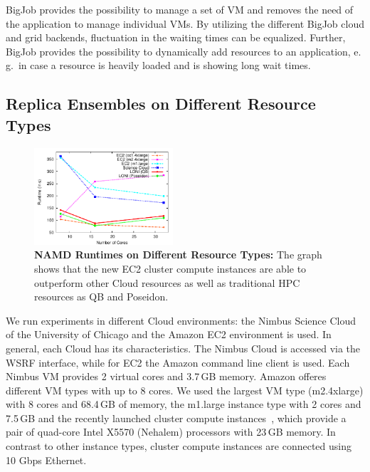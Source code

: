 \documentclass[conference,final]{IEEEtran}
\begin{document}
BigJob provides the possibility to manage a set of VM and removes the
need of the application to manage individual VMs. By utilizing
the different BigJob cloud and grid backends, fluctuation in the waiting 
times can be equalized. Further, BigJob provides the possibility
to dynamically add resources to an application, e.\,g.\ in case a
resource is heavily loaded and is showing long wait times.



\subsection{Replica Ensembles on Different Resource Types}
\label{sec:performance_namd}
\begin{figure}[htbp]
    \centering
        \includegraphics[width=0.46\textwidth]{performance/namd_run}
    \caption{\textbf{NAMD Runtimes on Different Resource Types: } The
          graph shows that the new EC2 cluster compute instances are 
          able to outperform other Cloud resources as well as traditional
          HPC resources as QB and Poseidon.}
    \label{fig:performance_namd_run}
\end{figure}

We run experiments in different Cloud environments: the Nimbus Science 
Cloud of the University of Chicago and the Amazon EC2 environment is used. In general, each Cloud has 
its characteristics. The Nimbus Cloud is accessed via the WSRF
interface, while for EC2 the Amazon command line client is used. 
Each Nimbus VM provides 2 virtual cores and 3.7\,GB memory. 
Amazon offeres different VM types with up to 8 cores. We used the largest 
VM type (m2.4xlarge) with 8 cores and 68.4\,GB of memory,
the m1.large instance type with 2 cores and 7.5\,GB  and the recently launched
cluster compute instances~\cite{ec2-cc}, which provide a pair of quad-core Intel 
X5570 (Nehalem) processors with 23\,GB memory. In contrast to other instance types,
cluster compute instances are connected using 10 Gbps Ethernet.
\end{document}
